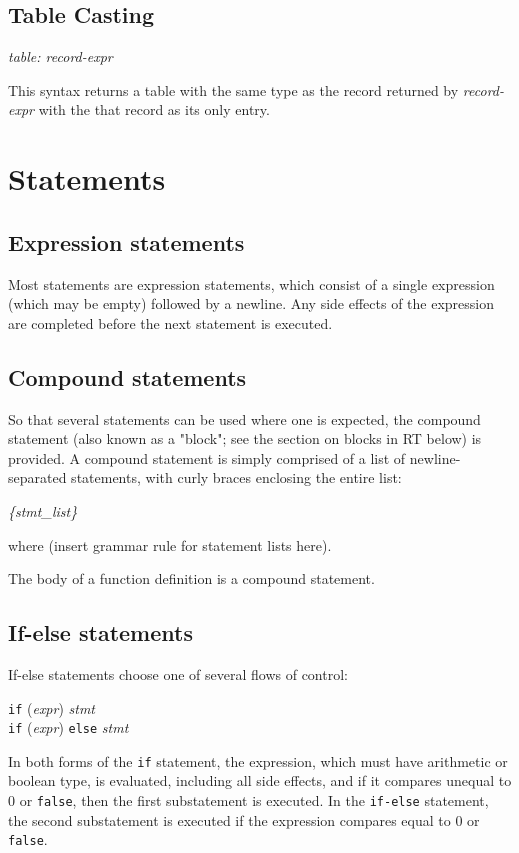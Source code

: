 \subsection{Table Casting}
\begin{center}
\textsl{table: record-expr}
\end{center}
This syntax returns a table with the same type as the record returned by \textsl{record-expr} with the 
that record as its only entry.

\section{Statements}

\subsection{Expression statements}
Most statements are expression statements, which consist of a single expression (which
may be empty) followed by a newline. Any side effects of the expression are completed before the next
statement is executed.

\subsection{Compound statements}
So that several statements can be used where one is expected, the compound statement
(also known as a "block"; see the section on blocks in RT below) is provided.  A
compound statement is simply comprised of a list of newline-separated statements, with
curly braces enclosing the entire list:
\begin{center}
\textsl{\{stmt\_list\}}
\end{center}
where (insert grammar rule for statement lists here).

The body of a function definition is a compound statement.

\subsection{If-else statements}
If-else statements choose one of several flows of control:
\begin{center}
\texttt{if} (\textsl{expr}) \textsl{stmt}\\
\texttt{if} (\textsl{expr}) \texttt{else} \textsl{stmt}
\end{center}

In both forms of the \texttt{if} statement, the expression, which must have
arithmetic or boolean type, is evaluated, including all side effects, and if it
compares unequal to 0 or \texttt{false}, then the first substatement is executed.
In the \texttt{if-else} statement, the second substatement is executed if the expression
compares equal to 0 or \texttt{false}.

